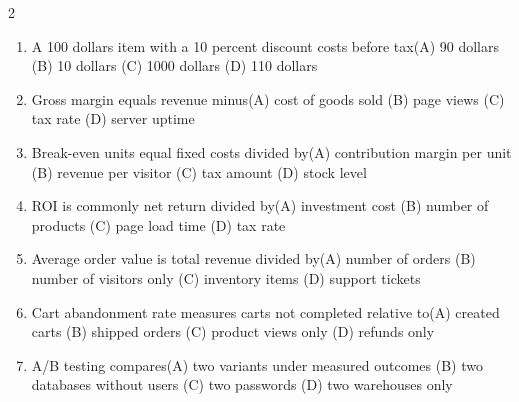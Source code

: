 \documentclass[a4paper]{article}
\begin{document}
\begin{multicols*}{2}
\begin{enumerate}[resume]
\item A 100 dollars item with a 10 percent discount costs before tax\newline\hspace*{0.6em}(A) 90 dollars \quad (B) 10 dollars \newline\hspace*{0.6em}(C) 1000 dollars \quad (D) 110 dollars
\item Gross margin equals revenue minus\newline\hspace*{0.6em}(A) cost of goods sold \quad (B) page views \newline\hspace*{0.6em}(C) tax rate \quad (D) server uptime
\item Break-even units equal fixed costs divided by\newline\hspace*{0.6em}(A) contribution margin per unit \quad (B) revenue per visitor \newline\hspace*{0.6em}(C) tax amount \quad (D) stock level
\item ROI is commonly net return divided by\newline\hspace*{0.6em}(A) investment cost \quad (B) number of products \newline\hspace*{0.6em}(C) page load time \quad (D) tax rate
\item Average order value is total revenue divided by\newline\hspace*{0.6em}(A) number of orders \quad (B) number of visitors only \newline\hspace*{0.6em}(C) inventory items \quad (D) support tickets
\item Cart abandonment rate measures carts not completed relative to\newline\hspace*{0.6em}(A) created carts \quad (B) shipped orders \newline\hspace*{0.6em}(C) product views only \quad (D) refunds only
\item A/B testing compares\newline\hspace*{0.6em}(A) two variants under measured outcomes \quad (B) two databases without users \newline\hspace*{0.6em}(C) two passwords \quad (D) two warehouses only

\end{enumerate}
\end{multicols*}
\end{document}
